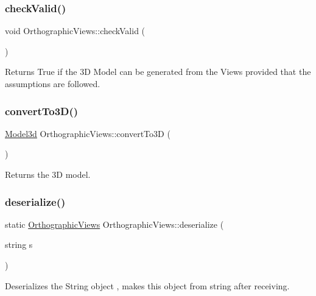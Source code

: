 \subsubsection{\texorpdfstring{check\+Valid()}{checkValid()}}
{\footnotesize\ttfamily void Orthographic\+Views\+::check\+Valid (\begin{DoxyParamCaption}{ }\end{DoxyParamCaption})}



Returns True if the 3D Model can be generated from the Views provided that the assumptions are followed. 

\mbox{\label{class_orthographic_views_a1048d31d2a202a8b5bc40a459d86e43b}} 
\subsubsection{\texorpdfstring{convert\+To3\+D()}{convertTo3D()}}
{\footnotesize\ttfamily \mbox{\hyperlink{class_model3d}{Model3d}} Orthographic\+Views\+::convert\+To3D (\begin{DoxyParamCaption}{ }\end{DoxyParamCaption})}



Returns the 3D model. 

\mbox{\label{class_orthographic_views_a242a3d205d29bc903936d31d97a5cf4a}} 
\subsubsection{\texorpdfstring{deserialize()}{deserialize()}}
{\footnotesize\ttfamily static \mbox{\hyperlink{class_orthographic_views}{Orthographic\+Views}} Orthographic\+Views\+::deserialize (\begin{DoxyParamCaption}\item[{string}]{s }\end{DoxyParamCaption})\hspace{0.3cm}{\ttfamily [static]}}



Deserializes the String object , makes this object from string after receiving. 


